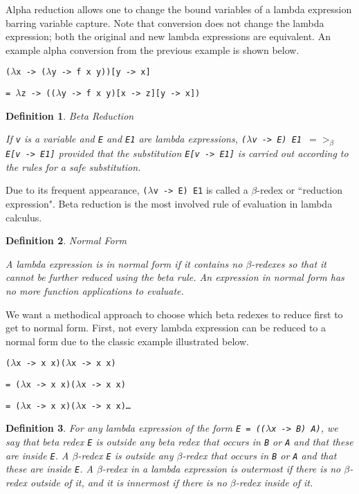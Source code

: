 \documentclass[11pt]{article}
\newtheorem{definition}{Definition}
\begin{document}
Alpha reduction allows one to change the bound variables of a lambda expression barring variable capture. Note that conversion does not change the lambda expression; both the original and new lambda expressions are equivalent. An example alpha conversion from the previous example is shown below.

\hspace{2cm}\texttt{($\lambda$x -> ($\lambda$y -> f x y))[y -> x]}\parskip 0pt

\hspace{2.5cm}\texttt{= $\lambda$z -> (($\lambda$y -> f x y)[x -> z][y -> x])}\parskip 6pt


\begin{definition}{Beta Reduction}

If \emph{\texttt{v}} is a variable and \emph{\texttt{E}} and \emph{\texttt{E1}} are lambda expressions, \emph{\texttt{($\lambda$v -> E) E1 $=>_{\beta}$ E[v -> E1]}} provided that the substitution \emph{\texttt{E[v -> E1]}} is carried out according to the rules for a safe substitution.
\end{definition}

Due to its frequent appearance, \texttt{($\lambda$v -> E) E1} is called a $\beta$-redex or ``reduction expression". Beta reduction is the most involved rule of evaluation in lambda calculus.


\begin{definition}{Normal Form}

A lambda expression is in normal form if it contains no $\beta$-redexes so that it cannot be further reduced using the beta rule. An expression in normal form has no more function applications to evaluate.
\end{definition}

We want a methodical approach to choose which beta redexes to reduce first to get to normal form. First, not every lambda expression can be reduced to a normal form due to the classic example illustrated below.

\hspace{2cm}\texttt{($\lambda$x -> x x)($\lambda$x -> x x)}\parskip 0pt

\hspace{2.5cm}\texttt{= ($\lambda$x -> x x)($\lambda$x -> x x)}\parskip 0pt

\hspace{2.5cm}\texttt{= ($\lambda$x -> x x)($\lambda$x -> x x)\ldots}\parskip 6pt

\begin{definition}

For any lambda expression of the form \emph{\texttt{E = (($\lambda$x -> B) A)}}, we say that beta redex \emph{\texttt{E}} is outside any beta redex that occurs in \emph{\texttt{B}} or \emph{\texttt{A}} and that these are inside \emph{\texttt{E}}. A $\beta$-redex \emph{\texttt{E}} is outside any $\beta$-redex that occurs in \emph{\texttt{B}} or \emph{\texttt{A}} and that these are inside \emph{\texttt{E}}. A $\beta$-redex in a lambda expression is outermost if there is no $\beta$-redex outside of it, and it is innermost if there is no $\beta$-redex inside of it.
\end{definition}
\end{document}
